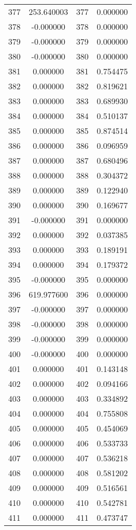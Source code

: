 \documentclass[12pt]{article}
\begin{document}
\begin{longtable}{@{}cccc@{}}
377 & 253.640003 & 377 & 0.000000 \\
378 & -0.000000 & 378 & 0.000000 \\
379 & -0.000000 & 379 & 0.000000 \\
380 & -0.000000 & 380 & 0.000000 \\
381 & 0.000000 & 381 & 0.754475 \\
382 & 0.000000 & 382 & 0.819621 \\
383 & 0.000000 & 383 & 0.689930 \\
384 & 0.000000 & 384 & 0.510137 \\
385 & 0.000000 & 385 & 0.874514 \\
386 & 0.000000 & 386 & 0.096959 \\
387 & 0.000000 & 387 & 0.680496 \\
388 & 0.000000 & 388 & 0.304372 \\
389 & 0.000000 & 389 & 0.122940 \\
390 & 0.000000 & 390 & 0.169677 \\
391 & -0.000000 & 391 & 0.000000 \\
392 & 0.000000 & 392 & 0.037385 \\
393 & 0.000000 & 393 & 0.189191 \\
394 & 0.000000 & 394 & 0.179372 \\
395 & -0.000000 & 395 & 0.000000 \\
396 & 619.977600 & 396 & 0.000000 \\
397 & -0.000000 & 397 & 0.000000 \\
398 & -0.000000 & 398 & 0.000000 \\
399 & -0.000000 & 399 & 0.000000 \\
400 & -0.000000 & 400 & 0.000000 \\
401 & 0.000000 & 401 & 0.143148 \\
402 & 0.000000 & 402 & 0.094166 \\
403 & 0.000000 & 403 & 0.334892 \\
404 & 0.000000 & 404 & 0.755808 \\
405 & 0.000000 & 405 & 0.454069 \\
406 & 0.000000 & 406 & 0.533733 \\
407 & 0.000000 & 407 & 0.536218 \\
408 & 0.000000 & 408 & 0.581202 \\
409 & 0.000000 & 409 & 0.516561 \\
410 & 0.000000 & 410 & 0.542781 \\
411 & 0.000000 & 411 & 0.473747 \\

\end{longtable}
\end{document}
